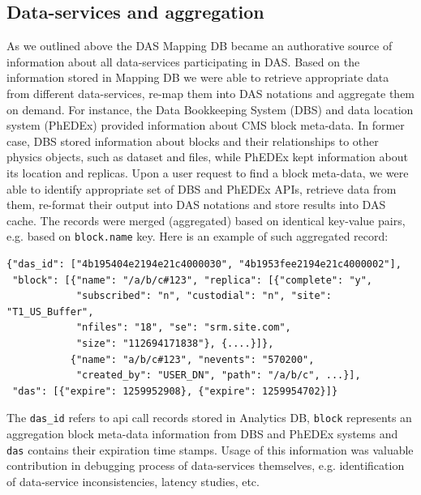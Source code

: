 \documentclass[1p,times]{elsarticle}
\begin{document}
\subsection{Data-services and aggregation}
As we outlined above the DAS Mapping DB became an authorative
source of information about all data-services participating in DAS.
Based on the information stored in Mapping DB we were able to 
retrieve appropriate data from different data-services, re-map them into 
DAS notations and aggregate them on demand. For instance, the Data 
Bookkeeping System (DBS) \cite{DBS} and data location system (PhEDEx) \cite{PhEDEx}
provided information about CMS block meta-data. In former case, DBS 
stored information about blocks and their relationships to other 
physics objects, such as dataset and files, while PhEDEx kept
information about its location and replicas. Upon a user request to 
find a block meta-data, we were able to identify appropriate set of 
DBS and PhEDEx APIs, retrieve data from them, re-format their output 
into DAS notations and store results into DAS cache. The records
were merged (aggregated) based on identical key-value pairs, e.g.
based on \verb+block.name+ key. Here is an example of such aggregated record:
\begin{verbatim}
{"das_id": ["4b195404e2194e21c4000030", "4b1953fee2194e21c4000002"], 
 "block": [{"name": "/a/b/c#123", "replica": [{"complete": "y", 
            "subscribed": "n", "custodial": "n", "site": "T1_US_Buffer", 
            "nfiles": "18", "se": "srm.site.com", 
            "size": "112694171838"}, {....}]},
           {"name": "a/b/c#123", "nevents": "570200", 
            "created_by": "USER_DN", "path": "/a/b/c", ...}],
 "das": [{"expire": 1259952908}, {"expire": 1259954702}]}
\end{verbatim}
The \verb+das_id+ refers to api call records stored in Analytics DB,
\verb+block+ represents an aggregation block meta-data information from DBS
and PhEDEx systems and \verb+das+ contains their expiration time stamps.
Usage of this information was valuable contribution in debugging process of
data-services themselves, e.g. identification of data-service inconsistencies, 
latency studies, etc.
\end{document}
